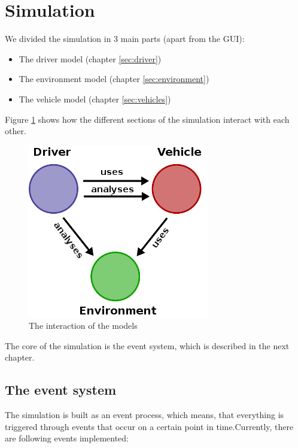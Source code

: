 
\section{Simulation}
\label{sec:simulation}

We divided the simulation in 3 main parts (apart from the GUI): \\

\begin{itemize}
\item The driver model (chapter \ref{sec:driver})
\item The environment model (chapter \ref{sec:environment})
\item The vehicle model (chapter \ref{sec:vehicles})
\end{itemize} 

\noindent Figure \ref{fig:simulationProcess} shows how the different sections
of the simulation interact with each other.

\begin{figure}[H]
\begin{center}
\includegraphics[scale=0.5]{images/process.png}
\end{center}
\caption{The interaction of the models}
\label{fig:simulationProcess}
\end{figure}

The core of the simulation is the event system, which is described in
the next chapter.

\subsection{The event system}
\label{sec:eventSystem}

The simulation is built as an event process, which means, that everything is
triggered through events that occur on a certain point in time.Currently,
there are following events implemented:

